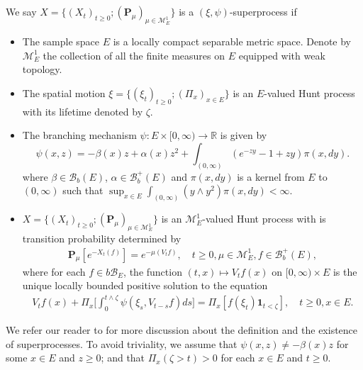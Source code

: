 \documentclass[12pt,oneside,english]{amsart}
\theoremstyle{plain}
\theoremstyle{definition}
\numberwithin{equation}{section}
\begin{document}
\subsection{}
\label{sec: definition of superprocess}
    We say $X=\{(X_t)_{t\geq 0}; (\mathbf P_\mu)_{\mu \in \mathcal M^1_E}\}$ is a $(\xi,\psi)$-superprocess if
\begin{itemize}
\item
    The sample space $E$ is a locally compact separable metric space.
    Denote by $\mathcal M_E^1$ the collection of all the finite measures on $E$ equipped with weak topology.
\item
    The spatial motion $\xi=\{(\xi_t)_{t\geq 0};(\Pi_x)_{x\in E}\}$ is an $E$-valued Hunt process with its lifetime denoted by $\zeta$.
\item
    The branching mechanism $\psi: E\times[0,\infty) \to \mathbb R$ is given by
\begin{equation}
\label{eq: branching mechanism}
    \psi(x,z)=
    - \beta(x) z + \alpha (x) z^2 + \int_{(0,\infty)} (e^{-zy} - 1 + zy) \pi(x,dy).
\end{equation}
    where $\beta \in \mathscr B_b(E)$, $\alpha \in \mathscr B^+_b(E)$ and $\pi(x,dy)$ is a kernel from $E$ to $(0,\infty)$ such that $\sup_{x\in E} \int_{(0,\infty)} (y\wedge y^2) \pi(x,dy) < \infty$.
\item
    $X=\{(X_t)_{t\geq 0}; (\mathbf P_\mu)_{\mu \in \mathcal M^1_E}\}$ is an $\mathcal M^1_E$-valued Hunt process with is transition probability determined by
\begin{align}
    \mathbf P_\mu [e^{-X_t(f)}] = e^{-\mu(V_tf)},
    \quad t\geq 0, \mu \in \mathcal M_E^1, f\in \mathscr B^+_b(E),
\end{align}
    where for each $f\in b\mathscr B_E$, the function $(t,x)\mapsto V_tf(x)$ on $[0,\infty) \times E$ is the unique locally bounded positive solution to the equation
\begin{align}\label{eq:FKPP_in_definition}
    V_tf(x) + \Pi_x \Big[  \int_0^{t\wedge \zeta} \psi(\xi_s,V_{t-s}f)ds \Big]
    = \Pi_x [ f(\xi_t)\mathbf 1_{t<\zeta} ],
    \quad t \geq 0, x \in E.
\end{align}
\end{itemize}
    We refer our reader to \cite{Li2011Measure-valued} for more discussion about the definition and the existence of superprocesses.
    To avoid triviality, we assume that $\psi(x,z)\neq -\beta(x)z$ for some $x \in E$ and $z \geq 0$; and that $\Pi_x(\zeta>t)>0$ for each $x \in E$ and $t \geq 0$.
\end{document}
